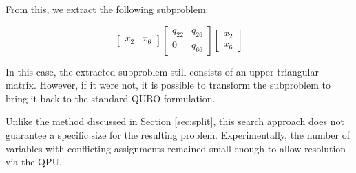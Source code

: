 From this, we extract the following subproblem:

\begin{equation*}
    \begin{bmatrix}
        x_2 & x_6
    \end{bmatrix}
    \begin{bmatrix}
        q_{22} & q_{26} \\
        0 & q_{66}
    \end{bmatrix}
    \begin{bmatrix}
        x_2 \\
        x_6
    \end{bmatrix}
\end{equation*}

In this case, the extracted subproblem still consists of an upper triangular matrix. 
However, if it were not, it is possible to transform the subproblem to bring it back to the standard QUBO formulation.

Unlike the method discussed in Section \ref{sec:split}, this search approach does not guarantee a specific size for the resulting problem. 
Experimentally, the number of variables with conflicting assignments remained small enough to allow resolution via the QPU.